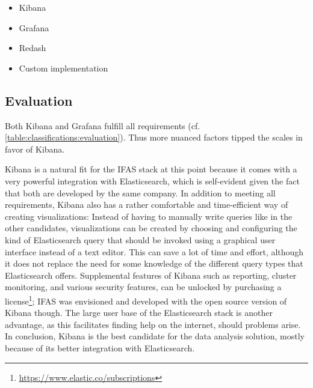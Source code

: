 \begin{itemize}[noitemsep]
\item Kibana
\item Grafana
\item Redash
\item Custom implementation
\end{itemize}

\subsection{Evaluation}

Both Kibana and Grafana fulfill all requirements (cf. \cref{table:classifications:evaluation}).
Thus more nuanced factors tipped the scales in favor of Kibana.

\begin{table}[t]
\centering
\caption[Classification of data analysis solutions.]{
Classification of data analysis solutions.
As all solutions meet all requirements, more nuanced differences decide about the ideal candidate.}
\label{table:classifications:evaluation}
\end{table}

Kibana is a natural fit for the \ac{IFAS} stack at this point because it comes with a very powerful integration with Elasticsearch, which is self-evident given the fact that both are developed by the same company.
In addition to meeting all requirements, Kibana also has a rather comfortable and time-efficient way of creating visualizations:
Instead of having to manually write queries like in the other candidates, visualizations can be created by choosing and configuring the kind of Elasticsearch query that should be invoked using a graphical user interface instead of a text editor.
This can save a lot of time and effort, although it does not replace the need for some knowledge of the different query types that Elasticsearch offers.
Supplemental features of Kibana such as reporting, cluster monitoring, and various security features, can be unlocked by purchasing a license\footnote{\url{https://www.elastic.co/subscriptions}}; \ac{IFAS} was envisioned and developed with the open source version of Kibana though.
The large user base of the Elasticsearch stack is another advantage, as this facilitates finding help on the internet, should problems arise.
In conclusion, Kibana is the best candidate for the data analysis solution, mostly because of its better integration with Elasticsearch.

